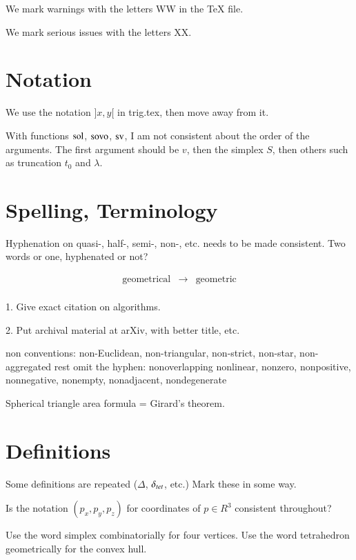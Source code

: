 

\label{XX}\label{tarski:XX}

We mark warnings with the letters WW in 
the TeX file.

We mark serious issues with the letters XX.

\section{Notation}

We use the notation $]x,y[$ in trig.tex, then move away from it.

With functions $\operatorname{sol}$, ${\operatorname{sovo}}$, ${\operatorname{sv}}$, I am not
consistent about the order of the arguments.
The first argument should be $v$, then the simplex $S$,
then others such as truncation $t_0$ and $\lambda$.

\section{Spelling, Terminology}

Hyphenation on  quasi-, half-, semi-, non-, etc. needs to be made
consistent.  Two words or one, hyphenated or not?

$$
\begin{array}{lll}
 \text{geometrical} &\to& \text{geometric}\\
\end{array}
$$


 1. Give exact citation on algorithms.

 2. Put archival material at arXiv, with better title, etc.



 non conventions:
 non-Euclidean, non-triangular, non-strict, non-star, non-aggregated
 rest omit the hyphen: nonoverlapping nonlinear, nonzero, nonpositive, nonnegative,
   nonempty, nonadjacent, nondegenerate


Spherical triangle area formula = Girard's theorem.

\section{Definitions}

Some definitions are repeated ($\Delta$, $\delta_{tet}$, etc.)
Mark these in some way.

Is the notation $(p_x,p_y,p_z)$ for coordinates 
of $p\in R^3$ consistent throughout?

Use the word simplex combinatorially for four vertices.
Use the word tetrahedron geometrically for the convex hull.

